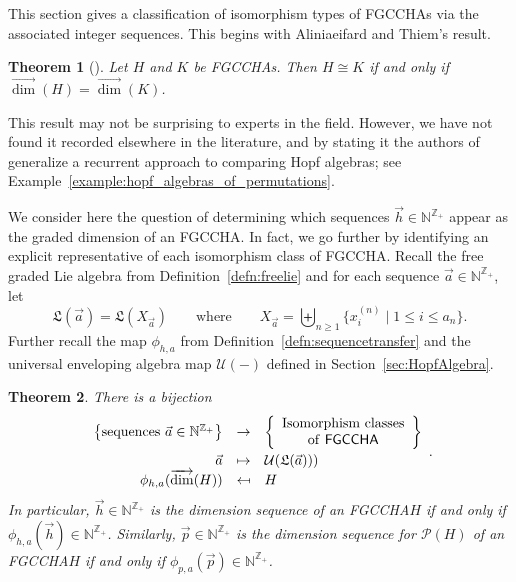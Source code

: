 \documentclass[11pt]{amsart}
\newtheorem{theorem}{Theorem}[section]
\theoremstyle{definition}
\numberwithin{equation}{section}
\def\NN{{\mathbb N}}
\def\ZZ{{\mathbb Z}}
\newcommand{\FGCCHA}{\textsf{FGCCHA}\xspace}
\newcommand{\FGCCHAs}{\textsf{FGCCHA}s\xspace}
\newcommand{\vecdim}{\overrightarrow{\dim}}
\newcommand{\lucas}[1]{\todo[size=\tiny,color=red!50]{#1 \\ \hfill --- Lucas}}
\begin{document}
This section gives a classification of isomorphism types of \FGCCHAs via the associated integer sequences.  
This begins with Aliniaeifard and Thiem's result.

\begin{theorem}[{\cite[Theorem 12]{AT22}}]
\label{thm:AT}
Let $H$ and $K$ be \FGCCHAs.  Then $H \cong K$ if and only if $\vecdim(H) = \vecdim(K)$.
\end{theorem}

This result may not be surprising to experts in the field.  
However, we have not found it recorded elsewhere in the literature, and by stating it the authors of~\cite{AT22} generalize a recurrent approach to comparing Hopf algebras; see Example~\ref{example:hopf_algebras_of_permutations}.

We consider here the question of determining which sequences $\vec{h} \in \NN^{\ZZ_+}$
appear as the graded dimension of an \FGCCHA.  In fact,
we go further by identifying an explicit representative of each isomorphism class of \FGCCHA.  
Recall the free graded Lie algebra from Definition~\ref{defn:freelie} and for each sequence $\vec{a} \in \NN^{\ZZ_{+}}$, let
\begin{equation}
\label{eq:La}
\mathfrak{L}(\vec{a}) = \mathfrak{L}(X_{\vec{a}}) \qquad\text{where}\qquad X_{\vec{a}} = \biguplus_{n \ge 1} \{x^{(n)}_{i} \;|\; 1 \le i \le a_{n}\}.
\end{equation}
Further recall the map $\phi_{h, a}$ from
Definition~\ref{defn:sequencetransfer} and the universal enveloping
algebra map $\mathcal{U}(-)$ defined in Section~\ref{sec:HopfAlgebra}.

\begin{theorem}
\label{thm:a sequence}
There is a bijection
\[
\begin{array}{rcl}
\left\{ \text{sequences }\vec{a} \in \NN^{\ZZ_+} \right\} & \to & \left\{ \begin{array}{c} \text{Isomorphism classes} \\ \text{of \FGCCHA} \end{array} \right\} \\[2ex]
\vec{a} & \mapsto & \mathcal{U}(\mathfrak{L}(\vec{a}))) \\
\phi_{h,a}(\vecdim(H)) & \mapsfrom & H
\end{array}.
\]
In particular, $\vec{h} \in \NN^{\ZZ_+}$ is the dimension sequence of an \FGCCHA $H$ if and only if $\phi_{h, a}(\vec{h}) \in \NN^{\ZZ_+}$.  
Similarly, $\vec{p} \in \NN^{\ZZ_{+}}$ is the dimension sequence for $\mathcal{P}(H)$ of an \FGCCHA $H$ if and only if $\phi_{p, a}(\vec{p}) \in \NN^{\ZZ_{+}}$.
\end{theorem}
\end{document}
